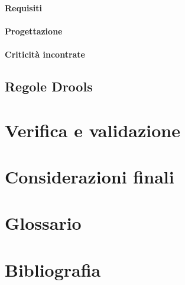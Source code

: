 	\paragraph{Requisiti}
	\paragraph{Progettazione}
	\paragraph{Criticità incontrate}


\subsection{Regole Drools}
	
\section{Verifica e validazione}
\section{Considerazioni finali}

\section{Glossario}
\section{Bibliografia}